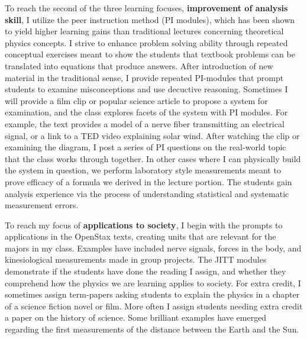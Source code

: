 \documentclass[../../../main.tex]{subfiles}
\begin{document}
To reach the second of the three learning focuses, \textbf{improvement of analysis skill}, I utilize the peer instruction method (PI modules), which has been shown to yield higher learning gains than traditional lectures concerning theoretical physics concepts.  I strive to enhance problem solving ability through repeated conceptual exercises meant to show the students that textbook problems can be translated into equations that produce answers.  After introduction of new material in the traditional sense, I provide repeated PI-modules that prompt students to examine misconceptions and use decuctive reasoning.  Sometimes I will provide a film clip or popular science article to propose a system for examination, and the class explores facets of the system with PI modules.  For example, the text provides a model of a nerve fiber transmitting an electrical signal, or a link to a TED video explaining solar wind.  After watching the clip or examining the diagram, I post a series of PI questions on the real-world topic that the class works through together. In other cases where I can physically build the system in question, we perform laboratory style measurements meant to prove efficacy of a formula we derived in the lecture portion.  The students gain analysis experience via the process of understanding statistical and systematic measurement errors. \\ \hspace{0.1cm}

To reach my focus of \textbf{applications to society}, I begin with the prompts to applications in the OpenStax texts, creating units that are relevant for the majors in my class.  Examples have included nerve signals, forces in the body, and kinesiological measurements made in group projects. The JITT modules demonstrate if the students have done the reading I assign, and whether they comprehend how the physics we are learning applies to society. For extra credit, I sometimes assign term-papers asking students to explain the physics in a chapter of a science fiction novel or film.  More often I assign students needing extra credit a paper on the history of science.  Some brilliant examples have emerged regarding the first measurements of the distance between the Earth and the Sun. \\ \hspace{0.1cm}
\end{document}
